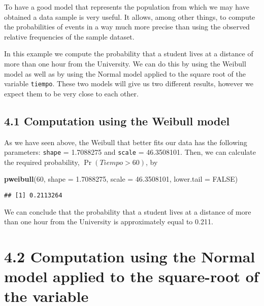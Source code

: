 \documentclass[
]{article}
\newenvironment{Shaded}{\begin{snugshade}}{\end{snugshade}}
\newcommand{\AttributeTok}[1]{\textcolor[rgb]{0.13,0.29,0.53}{#1}}
\newcommand{\ConstantTok}[1]{\textcolor[rgb]{0.56,0.35,0.01}{#1}}
\newcommand{\DecValTok}[1]{\textcolor[rgb]{0.00,0.00,0.81}{#1}}
\newcommand{\FloatTok}[1]{\textcolor[rgb]{0.00,0.00,0.81}{#1}}
\newcommand{\FunctionTok}[1]{\textcolor[rgb]{0.13,0.29,0.53}{\textbf{#1}}}
\newcommand{\NormalTok}[1]{#1}
\begin{document}
To have a good model that represents the population from which we may
have obtained a data sample is very useful. It allows, among other
things, to compute the probabilities of events in a way much more
precise than using the observed relative frequencies of the sample
dataset.

In this example we compute the probability that a student lives at a
distance of more than one hour from the University. We can do this by
using the Weibull model as well as by using the Normal model applied to
the square root of the variable \texttt{tiempo}. These two models will
give us two different results, however we expect them to be very close
to each other.

\hypertarget{computation-using-the-weibull-model}{%
\subsection{4.1 Computation using the Weibull
model}\label{computation-using-the-weibull-model}}

As we have seen above, the Weibull that better fits our data has the
following parameters: \texttt{shape} = 1.7088275 and \texttt{scale} =
46.3508101. Then, we can calculate the required probability,
\(\Pr(Tiempo > 60)\), by

\begin{Shaded}
\begin{Highlighting}[]
\FunctionTok{pweibull}\NormalTok{(}\DecValTok{60}\NormalTok{, }\AttributeTok{shape =} \FloatTok{1.7088275}\NormalTok{, }\AttributeTok{scale =} \FloatTok{46.3508101}\NormalTok{, }\AttributeTok{lower.tail =} \ConstantTok{FALSE}\NormalTok{)}
\end{Highlighting}
\end{Shaded}

\begin{verbatim}
## [1] 0.2113264
\end{verbatim}

We can conclude that the probability that a student lives at a distance
of more than one hour from the University is approximately equal to
0.211.

\hypertarget{computation-using-the-normal-model-applied-to-the-square-root-of-the-variable}{%
\section{4.2 Computation using the Normal model applied to the
square-root of the
variable}\label{computation-using-the-normal-model-applied-to-the-square-root-of-the-variable}}
\end{document}
